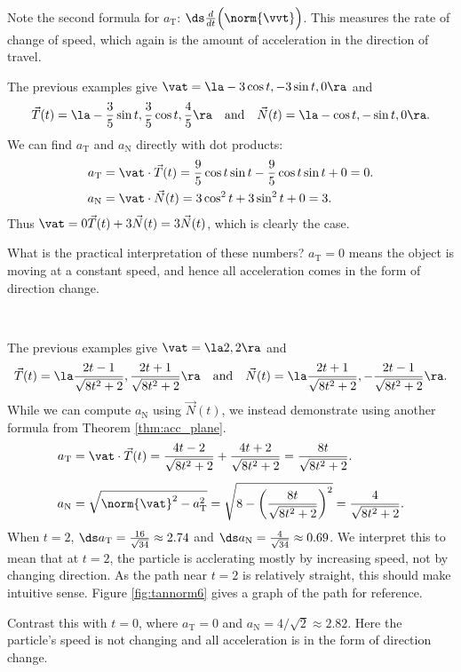 Note the second formula for $a_\text{T}$: $\ds \frac{d}{dt}\Big(\norm{\vvt}\Big)$. This measures the rate of change of speed, which again is the amount of acceleration in the direction of travel.\\

{The previous examples give $\vat = \la -3\cos t,-3\sin t,0\ra$ and 
$$\vec T(t) = \la -\frac35\sin t,\frac35\cos t,\frac45\ra \quad \text{and}\quad \vec N(t) = \la -\cos t,-\sin t,0\ra.$$
We can find $a_\text{T}$ and $a_\text{N}$ directly with dot products:
\begin{align*}
a_\text{T} &= \vat\cdot \vec T(t) = \frac95\cos t\sin t-\frac95\cos t\sin t+0 = 0.\\
a_\text{N} &= \vat\cdot \vec N(t) = 3\cos^2t+3\sin^2t + 0 = 3.
\end{align*}
Thus $\vat = 0\vec T(t) + 3\vec N(t) = 3\vec N(t)$, which is clearly the case.

What is the practical interpretation of these numbers? $a_\text{T}=0$ means the object is moving at a constant speed, and hence all acceleration comes in the form of direction change.
}\\

{The previous examples give $\vat = \la 2,2\ra$ and
$$\vec T(t) = \la \frac{2t-1}{\sqrt{8t^2+2}},\frac{2t+1}{\sqrt{8t^2+2}}\ra \quad \text{and}\quad \vec N(t) = \la \frac{2t+1}{\sqrt{8t^2+2}},-\frac{2t-1}{\sqrt{8t^2+2}}\ra.$$
While we can compute $a_\text{N}$ using $\vec N(t)$, we instead demonstrate using another formula from Theorem \ref{thm:acc_plane}.
\begin{align*}
a_\text{T} &= \vat\cdot\vec T(t) = \frac{4t-2}{\sqrt{8t^2+2}}+\frac{4t+2}{\sqrt{8t^2+2}} = \frac{8t}{\sqrt{8t^2+2}}.\\
a_\text{N} &= \sqrt{\norm{\vat}^2-a_\text{T}^2} = \sqrt{8-\left(\frac{8t}{\sqrt{8t^2+2}}\right)^2}=\frac{4}{\sqrt{8t^2+2}}\rule{0pt}{25pt}.
\end{align*}
When $t=2$, $\ds a_\text{T} = \frac{16}{\sqrt{34}}\approx 2.74$ and $\ds a_\text{N} = \frac{4}{\sqrt{34}} \approx 0.69$. We interpret this to mean that at $t=2$, the particle is acclerating mostly by increasing speed, not by changing direction. As the path near $t=2$ is relatively straight, this should make intuitive sense. Figure \ref{fig:tannorm6} gives a graph of the path for reference.

Contrast this with $t=0$, where $a_\text{T} = 0$ and $a_\text{N} = 4/\sqrt{2}\approx 2.82$. Here the particle's speed is not changing and all acceleration is in the form of direction change.
}\\

